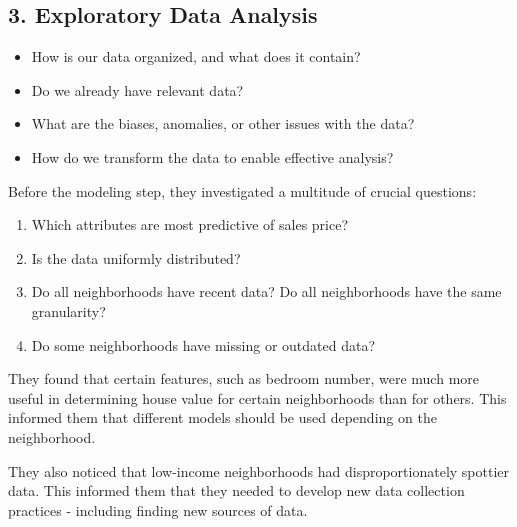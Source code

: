 \documentclass[
  letterpaper,
  DIV=11,
  numbers=noendperiod]{scrreprt}
\providecommand{\tightlist}{%
  \setlength{\itemsep}{0pt}\setlength{\parskip}{0pt}}\usepackage{longtable,booktabs,array}
\begin{document}
\subsection{3. Exploratory Data
Analysis}\label{exploratory-data-analysis}

\begin{tcolorbox}[enhanced jigsaw, coltitle=black, leftrule=.75mm, left=2mm, bottomrule=.15mm, bottomtitle=1mm, opacityback=0, breakable, arc=.35mm, opacitybacktitle=0.6, toptitle=1mm, title=\textcolor{quarto-callout-note-color}{\faInfo}\hspace{0.5em}{Driving Questions}, colbacktitle=quarto-callout-note-color!10!white, titlerule=0mm, rightrule=.15mm, colframe=quarto-callout-note-color-frame, toprule=.15mm, colback=white]

\begin{itemize}
\tightlist
\item
  How is our data organized, and what does it contain?
\item
  Do we already have relevant data?
\item
  What are the biases, anomalies, or other issues with the data?
\item
  How do we transform the data to enable effective analysis?
\end{itemize}

\end{tcolorbox}

Before the modeling step, they investigated a multitude of crucial
questions:

\begin{enumerate}
\def\labelenumi{\arabic{enumi}.}
\tightlist
\item
  Which attributes are most predictive of sales price?
\item
  Is the data uniformly distributed?
\item
  Do all neighborhoods have recent data? Do all neighborhoods have the
  same granularity?\\
\item
  Do some neighborhoods have missing or outdated data?
\end{enumerate}

They found that certain features, such as bedroom number, were much more
useful in determining house value for certain neighborhoods than for
others. This informed them that different models should be used
depending on the neighborhood.

They also noticed that low-income neighborhoods had disproportionately
spottier data. This informed them that they needed to develop new data
collection practices - including finding new sources of data.
\end{document}
